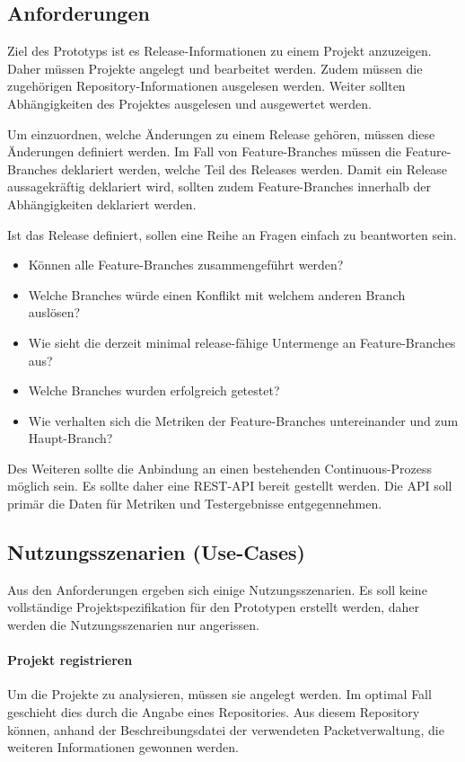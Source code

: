 \subsection{Anforderungen}

Ziel des Prototyps ist es Release-Informationen zu einem Projekt anzuzeigen. Daher müssen Projekte angelegt und bearbeitet werden. Zudem müssen die zugehörigen Repository-Informationen ausgelesen werden. Weiter sollten Abhängigkeiten des Projektes ausgelesen und ausgewertet werden. 

Um einzuordnen, welche Änderungen zu einem Release gehören, müssen diese Änderungen definiert werden. Im Fall von Feature-Branches müssen die Feature-Branches deklariert werden, welche Teil des Releases werden. Damit ein Release aussagekräftig deklariert wird, sollten zudem Feature-Branches innerhalb der Abhängigkeiten deklariert werden.

Ist das Release definiert, sollen eine Reihe an Fragen einfach zu beantworten sein. 
\begin{itemize}
\item Können alle Feature-Branches zusammengeführt werden?
\item Welche Branches würde einen Konflikt mit welchem anderen Branch auslösen?
\item Wie sieht die derzeit minimal release-fähige Untermenge an Feature-Branches aus?
\item Welche Branches wurden erfolgreich getestet?
\item Wie verhalten sich die Metriken der Feature-Branches untereinander und zum Haupt-Branch?
\end{itemize}

Des Weiteren sollte die Anbindung an einen bestehenden Continuous-Prozess möglich sein. Es sollte daher eine REST-API bereit gestellt werden. Die API soll primär die Daten für Metriken und Testergebnisse entgegennehmen.

\subsection{Nutzungsszenarien (Use-Cases)}

Aus den Anforderungen ergeben sich einige Nutzungsszenarien. Es soll keine vollständige Projektspezifikation für den Prototypen erstellt werden, daher werden die Nutzungsszenarien nur angerissen. 

\paragraph{Projekt registrieren}
Um die Projekte zu analysieren, müssen sie angelegt werden. Im optimal Fall geschieht dies durch die Angabe eines Repositories. Aus diesem Repository können, anhand der Beschreibungsdatei der verwendeten Packetverwaltung, die weiteren Informationen gewonnen werden.

